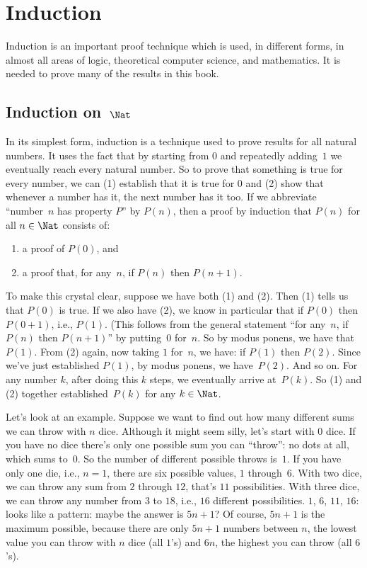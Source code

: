 \documentclass[../../../include/open-logic-section]{subfiles}
\begin{document}
\chapter{Induction}

\label{induction}

Induction is an important proof technique which is used, in different
forms, in almost all areas of logic, theoretical computer science, and
mathematics.  It is needed to prove many of the results in this book.

\section{Induction on~$\Nat$}

In its simplest form, induction is a technique used to prove results
for all natural numbers. It uses the fact that by starting from $0$
and repeatedly adding~$1$ we eventually reach every natural number.  So
to prove that something is true for every number, we can (1) establish
that it is true for $0$ and (2) show that whenever a number has it,
the next number has it too.  If we abbreviate ``number~$n$ has
property $P$'' by $P(n)$, then a proof by induction that $P(n)$ for
all $n \in \Nat$ consists of:
\begin{enumerate}
\item a proof of $P(0)$, and
\item a proof that, for any~$n$, if $P(n)$ then $P(n+1)$.
\end{enumerate}
To make this crystal clear, suppose we have both (1) and (2).  Then
(1) tells us that $P(0)$ is true.  If we also have (2), we know in
particular that if $P(0)$ then $P(0+1)$, i.e., $P(1)$. (This follows
from the general statement ``for any~$n$, if $P(n)$ then $P(n+1)$'' by
putting~$0$ for~$n$.  So by modus ponens, we have that $P(1)$.  From
(2) again, now taking $1$ for~$n$, we have: if $P(1)$ then $P(2)$.
Since we've just established $P(1)$, by modus ponens, we
have~$P(2)$. And so on.  For any number $k$, after doing this $k$
steps, we eventually arrive at~$P(k)$.  So (1) and (2) together
established~$P(k)$ for any $k \in \Nat$.

Let's look at an example.  Suppose we want to find out how many
different sums we can throw with $n$ dice.  Although it might seem
silly, let's start with $0$ dice.  If you have no dice there's only one
possible sum you can ``throw'': no dots at all, which sums to~$0$. So
the number of different possible throws is~$1$. If you have only one
die, i.e., $n=1$, there are six possible values, $1$ through~$6$. With
two dice, we can throw any sum from $2$ through $12$, that's $11$
possibilities.  With three dice, we can throw any number from $3$ to
$18$, i.e., $16$ different possibilities.  $1$, $6$, $11$, $16$: looks
like a pattern: maybe the answer is $5n+1$?  Of course, $5n+1$ is the
maximum possible, because there are only $5n+1$ numbers between $n$,
the lowest value you can throw with $n$ dice (all $1$'s) and $6n$, the
highest you can throw (all $6$'s).
\end{document}
